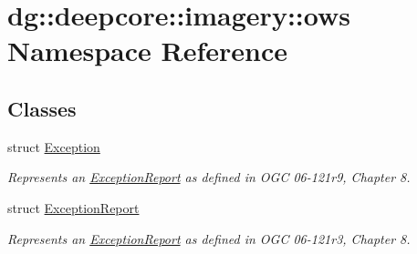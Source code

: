 \hypertarget{namespacedg_1_1deepcore_1_1imagery_1_1ows}{}\section{dg\+:\+:deepcore\+:\+:imagery\+:\+:ows Namespace Reference}
\label{namespacedg_1_1deepcore_1_1imagery_1_1ows}
\subsection*{Classes}
\begin{DoxyCompactItemize}
\item 
struct \hyperlink{structdg_1_1deepcore_1_1imagery_1_1ows_1_1_exception}{Exception}
\begin{DoxyCompactList}\small\item\em Represents an \hyperlink{structdg_1_1deepcore_1_1imagery_1_1ows_1_1_exception_report}{Exception\+Report} as defined in O\+GC 06-\/121r9, Chapter 8. \end{DoxyCompactList}\item 
struct \hyperlink{structdg_1_1deepcore_1_1imagery_1_1ows_1_1_exception_report}{Exception\+Report}
\begin{DoxyCompactList}\small\item\em Represents an \hyperlink{structdg_1_1deepcore_1_1imagery_1_1ows_1_1_exception_report}{Exception\+Report} as defined in O\+GC 06-\/121r3, Chapter 8. \end{DoxyCompactList}\end{DoxyCompactItemize}
